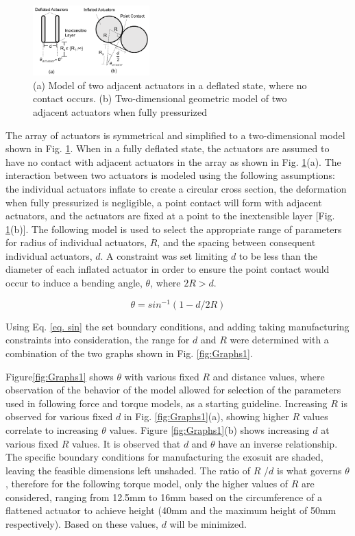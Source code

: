 \documentclass[letterpaper, 10 pt, conference]{ieeeconf}  %
\begin{document}
\begin{figure}[t!]
\centering
\includegraphics[width=0.4\textwidth]{ActuatorModel1.PNG}
\caption{(a) Model of two adjacent actuators in a deflated state, where no contact occurs.  (b) Two-dimensional geometric model of two adjacent actuators when fully pressurized}
\label{fig:Model1}

\end{figure}

The array of actuators is symmetrical and simplified to a two-dimensional model shown in Fig. \ref{fig:Model1}. When in a fully deflated state, the actuators are assumed to have no contact with adjacent actuators in the array as shown in Fig. \ref{fig:Model1}(a). The interaction between two actuators is modeled using the following assumptions: the individual actuators inflate to create a circular cross section, the deformation when fully pressurized is negligible, a point contact will form with adjacent actuators, and the actuators are fixed at a point to the inextensible layer [Fig. \ref{fig:Model1}(b)].  The following model is used to select the appropriate range of parameters for radius of individual actuators, $R$, and the spacing between consequent individual actuators, $d$.  A constraint was set limiting $d$ to be less than the diameter of each inflated actuator in order to ensure the point contact would occur to induce a bending angle, $\theta$, where $ 2R > d$. 

\begin{equation}\label{eq. sin}
	\theta=sin^{-1}(1-d/2R) 
\end{equation}

Using Eq. \ref{eq. sin} the set boundary conditions, and adding taking manufacturing constraints into consideration, the range for $d$ and $R$ were determined with a combination of the two graphs shown in Fig. \ref{fig:Graphs1}.   
 
Figure\ref{fig:Graphs1} shows $\theta$ with various fixed $R$ and distance values, where observation of the behavior of the model allowed for selection of the parameters used in following force and torque models, as a starting guideline.  Increasing $R$ is observed for various fixed $d$ in Fig. \ref{fig:Graphs1}(a), showing higher $R$ values correlate to increasing  $\theta$ values.  Figure \ref{fig:Graphs1}(b) shows increasing $d$ at various fixed $R$ values.  It is observed that $d$ and $\theta$ have an inverse relationship.  The specific boundary conditions for manufacturing the exosuit are shaded, leaving the feasible dimensions left unshaded.  The ratio of $R$ /$d$  is what governs $\theta$, therefore for the following torque model, only the higher values of $R$ are considered, ranging from 12.5mm to 16mm based on the circumference of a flattened actuator to achieve height (40mm and the maximum height of 50mm respectively).  Based on these values, $d$ will be minimized.
\end{document}
